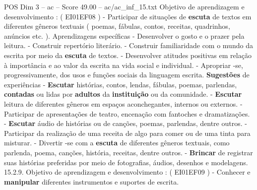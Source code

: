 \begin{textsample}{POS Dim 3 – ac – Score 49.00 – ac/ac\_inf\_15.txt}
Objetivo de aprendizagem e desenvolvimento : ( EI01EF08 ) - Participar de situações de \textbf{escuta} de textos em diferentes gêneros textuais ( poemas, fábulas, contos, receitas, quadrinhos, anúncios etc. ).
Aprendizagens específicas - Desenvolver o gosto e o prazer pela leitura. - Construir repertório literário. - Construir familiaridade com o mundo da escrita por meio da \textbf{escuta} de textos. - Desenvolver atitudes positivas em relação à importância e ao valor da escrita na vida social e individual. - Apropriar -se, progressivamente, dos usos e funções sociais da linguagem escrita. \textbf{Sugestões} de experiências - \textbf{Escutar} histórias, contos, lendas, fábulas, poemas, parlendas, \textbf{contadas} ou lidas por \textbf{adultos} da \textbf{instituição} ou da comunidade. - \textbf{Escutar} leitura de diferentes gêneros em espaços aconchegantes, internos ou externos. - Participar de apresentações de teatro, encenação com fantoches e dramatizações. - \textbf{Escutar} áudio de histórias ou de canções, poemas, parlendas, dentre outros. - Participar da realização de uma receita de algo para comer ou de uma tinta para misturar. - Divertir -se com a \textbf{escuta} de diferentes gêneros textuais, como parlenda, poema, canções, história, receitas, dentre outros. - \textbf{Brincar} de registrar suas histórias preferidas por meio de fotografias, áudios, desenhos e modelagens. 15.2.9.
Objetivo de aprendizagem e desenvolvimento : ( EI01EF09 ) - Conhecer e \textbf{manipular} diferentes instrumentos e suportes de escrita.

\end{textsample}
